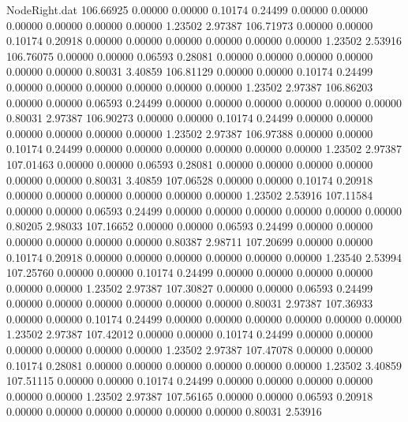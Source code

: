 \begin{filecontents}{NodeRight.dat}
 106.66925    0.00000    0.00000     0.10174    0.24499    0.00000    0.00000    0.00000    0.00000    0.00000    0.00000    1.23502    2.97387
 106.71973    0.00000    0.00000     0.10174    0.20918    0.00000    0.00000    0.00000    0.00000    0.00000    0.00000    1.23502    2.53916
 106.76075    0.00000    0.00000     0.06593    0.28081    0.00000    0.00000    0.00000    0.00000    0.00000    0.00000    0.80031    3.40859
 106.81129    0.00000    0.00000     0.10174    0.24499    0.00000    0.00000    0.00000    0.00000    0.00000    0.00000    1.23502    2.97387
 106.86203    0.00000    0.00000     0.06593    0.24499    0.00000    0.00000    0.00000    0.00000    0.00000    0.00000    0.80031    2.97387
 106.90273    0.00000    0.00000     0.10174    0.24499    0.00000    0.00000    0.00000    0.00000    0.00000    0.00000    1.23502    2.97387
 106.97388    0.00000    0.00000     0.10174    0.24499    0.00000    0.00000    0.00000    0.00000    0.00000    0.00000    1.23502    2.97387
 107.01463    0.00000    0.00000     0.06593    0.28081    0.00000    0.00000    0.00000    0.00000    0.00000    0.00000    0.80031    3.40859
 107.06528    0.00000    0.00000     0.10174    0.20918    0.00000    0.00000    0.00000    0.00000    0.00000    0.00000    1.23502    2.53916
 107.11584    0.00000    0.00000     0.06593    0.24499    0.00000    0.00000    0.00000    0.00000    0.00000    0.00000    0.80205    2.98033
 107.16652    0.00000    0.00000     0.06593    0.24499    0.00000    0.00000    0.00000    0.00000    0.00000    0.00000    0.80387    2.98711
 107.20699    0.00000    0.00000     0.10174    0.20918    0.00000    0.00000    0.00000    0.00000    0.00000    0.00000    1.23540    2.53994
 107.25760    0.00000    0.00000     0.10174    0.24499    0.00000    0.00000    0.00000    0.00000    0.00000    0.00000    1.23502    2.97387
 107.30827    0.00000    0.00000     0.06593    0.24499    0.00000    0.00000    0.00000    0.00000    0.00000    0.00000    0.80031    2.97387
 107.36933    0.00000    0.00000     0.10174    0.24499    0.00000    0.00000    0.00000    0.00000    0.00000    0.00000    1.23502    2.97387
 107.42012    0.00000    0.00000     0.10174    0.24499    0.00000    0.00000    0.00000    0.00000    0.00000    0.00000    1.23502    2.97387
 107.47078    0.00000    0.00000     0.10174    0.28081    0.00000    0.00000    0.00000    0.00000    0.00000    0.00000    1.23502    3.40859
 107.51115    0.00000    0.00000     0.10174    0.24499    0.00000    0.00000    0.00000    0.00000    0.00000    0.00000    1.23502    2.97387
 107.56165    0.00000    0.00000     0.06593    0.20918    0.00000    0.00000    0.00000    0.00000    0.00000    0.00000    0.80031    2.53916

\end{filecontents}
